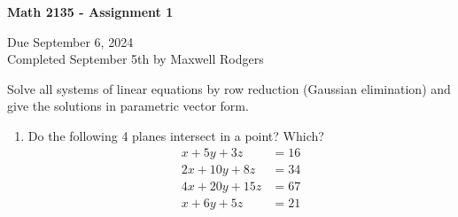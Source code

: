 \documentclass[12pt,a4paper]{exam}
\begin{document}
\begin{center}
\begin{Large}
{\bf Math 2135 - Assignment 1}
\end{Large}

\bigskip
Due September 6, 2024\\Completed September 5th by Maxwell Rodgers
\end{center}

\bigskip
\printanswers

 Solve all systems of linear equations by row reduction (Gaussian elimination) and give the solutions in
 parametric vector form.

\renewcommand{\solutiontitle}{\noindent\textbf{Ans:}\enspace}   %
    
\begin{enumerate}
\item
 Do the following 4 planes intersect in a point? Which?
\begin{align*}
 x+5y+3z & = 16 \\
 2x+10y+8z & = 34 \\
 4x+20y+15z & = 67 \\
 x+6y+5z & = 21
\end{align*}


\end{enumerate}
\end{document}
